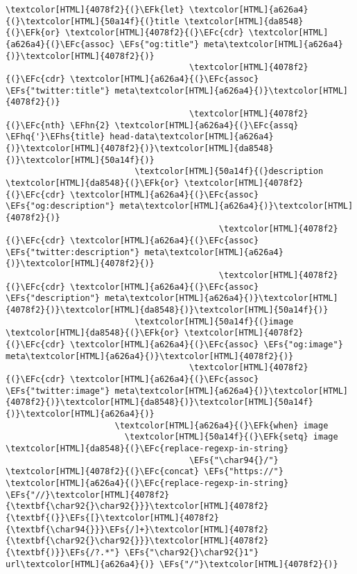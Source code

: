 \documentclass{scrartcl}
\newcommand{\EFk}[1]{\textcolor{EFk}{#1}} %
\newcommand{\EFs}[1]{\textcolor{EFs}{#1}} %
\newcommand{\EFc}[1]{\textcolor{EFc}{#1}} %
\newcommand{\EFhn}[1]{\textcolor{EFhn}{\textbf{#1}}} %
\newcommand{\EFhq}[1]{\textcolor{EFhq}{#1}} %
\newcommand{\EFhs}[1]{\textcolor{EFhs}{#1}} %
\begin{document}
\begin{Code}
\begin{Verbatim}[]
                    \textcolor[HTML]{4078f2}{(}\EFk{let} \textcolor[HTML]{a626a4}{(}\textcolor[HTML]{50a14f}{(}title \textcolor[HTML]{da8548}{(}\EFk{or} \textcolor[HTML]{4078f2}{(}\EFc{cdr} \textcolor[HTML]{a626a4}{(}\EFc{assoc} \EFs{"og:title"} meta\textcolor[HTML]{a626a4}{)}\textcolor[HTML]{4078f2}{)}
                                     \textcolor[HTML]{4078f2}{(}\EFc{cdr} \textcolor[HTML]{a626a4}{(}\EFc{assoc} \EFs{"twitter:title"} meta\textcolor[HTML]{a626a4}{)}\textcolor[HTML]{4078f2}{)}
                                     \textcolor[HTML]{4078f2}{(}\EFc{nth} \EFhn{2} \textcolor[HTML]{a626a4}{(}\EFc{assq} \EFhq{'}\EFhs{title} head-data\textcolor[HTML]{a626a4}{)}\textcolor[HTML]{4078f2}{)}\textcolor[HTML]{da8548}{)}\textcolor[HTML]{50a14f}{)}
                          \textcolor[HTML]{50a14f}{(}description \textcolor[HTML]{da8548}{(}\EFk{or} \textcolor[HTML]{4078f2}{(}\EFc{cdr} \textcolor[HTML]{a626a4}{(}\EFc{assoc} \EFs{"og:description"} meta\textcolor[HTML]{a626a4}{)}\textcolor[HTML]{4078f2}{)}
                                           \textcolor[HTML]{4078f2}{(}\EFc{cdr} \textcolor[HTML]{a626a4}{(}\EFc{assoc} \EFs{"twitter:description"} meta\textcolor[HTML]{a626a4}{)}\textcolor[HTML]{4078f2}{)}
                                           \textcolor[HTML]{4078f2}{(}\EFc{cdr} \textcolor[HTML]{a626a4}{(}\EFc{assoc} \EFs{"description"} meta\textcolor[HTML]{a626a4}{)}\textcolor[HTML]{4078f2}{)}\textcolor[HTML]{da8548}{)}\textcolor[HTML]{50a14f}{)}
                          \textcolor[HTML]{50a14f}{(}image \textcolor[HTML]{da8548}{(}\EFk{or} \textcolor[HTML]{4078f2}{(}\EFc{cdr} \textcolor[HTML]{a626a4}{(}\EFc{assoc} \EFs{"og:image"} meta\textcolor[HTML]{a626a4}{)}\textcolor[HTML]{4078f2}{)}
                                     \textcolor[HTML]{4078f2}{(}\EFc{cdr} \textcolor[HTML]{a626a4}{(}\EFc{assoc} \EFs{"twitter:image"} meta\textcolor[HTML]{a626a4}{)}\textcolor[HTML]{4078f2}{)}\textcolor[HTML]{da8548}{)}\textcolor[HTML]{50a14f}{)}\textcolor[HTML]{a626a4}{)}
                      \textcolor[HTML]{a626a4}{(}\EFk{when} image
                        \textcolor[HTML]{50a14f}{(}\EFk{setq} image \textcolor[HTML]{da8548}{(}\EFc{replace-regexp-in-string}
                                     \EFs{"\char94{}/"} \textcolor[HTML]{4078f2}{(}\EFc{concat} \EFs{"https://"} \textcolor[HTML]{a626a4}{(}\EFc{replace-regexp-in-string} \EFs{"//}\textcolor[HTML]{4078f2}{\textbf{\char92{}\char92{}}}\textcolor[HTML]{4078f2}{\textbf{(}}\EFs{[}\textcolor[HTML]{4078f2}{\textbf{\char94{}}}\EFs{/]+}\textcolor[HTML]{4078f2}{\textbf{\char92{}\char92{}}}\textcolor[HTML]{4078f2}{\textbf{)}}\EFs{/?.*"} \EFs{"\char92{}\char92{}1"} url\textcolor[HTML]{a626a4}{)} \EFs{"/"}\textcolor[HTML]{4078f2}{)}

\end{Verbatim}
\end{Code}
\end{document}
